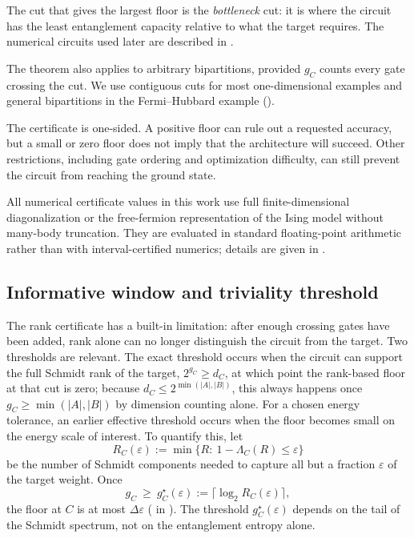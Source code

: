 \documentclass[reprint,aps,pra,floatfix,superscriptaddress,nofootinbib,longbibliography]{revtex4-2}
\theoremstyle{remark}
\theoremstyle{definition}
\begin{document}
The cut that gives the largest floor is the \emph{bottleneck} cut: it is where
the circuit has the least entanglement capacity relative to what the target
requires. The numerical circuits used later are described in
.

The theorem also applies to arbitrary bipartitions, provided $g_C$ counts every
gate crossing the cut. We use contiguous cuts for most one-dimensional examples
and general bipartitions in the Fermi--Hubbard example ().

The certificate is one-sided. A positive floor can rule out a requested
accuracy, but a small or zero floor does not imply that the architecture will
succeed. Other restrictions, including gate
ordering and optimization difficulty, can still prevent the circuit from reaching
the ground state.

All numerical certificate values in this work use full finite-dimensional
diagonalization or the free-fermion representation of the Ising model without
many-body truncation. They
are evaluated in standard floating-point arithmetic rather than with
interval-certified numerics; details are given in .

\subsection{Informative window and triviality threshold}
\label{sec:window}

The rank certificate has a built-in limitation: after enough crossing gates have
been added, rank alone can no longer distinguish the circuit from the target.
Two thresholds are relevant. The exact threshold occurs when the circuit can
support the full Schmidt rank of the target, $2^{g_C}\ge d_C$, at which point
the rank-based floor at that cut is zero; because $d_C\le2^{\min(|A|,|B|)}$,
this always happens once $g_C\ge\min(|A|,|B|)$ by dimension counting alone. For
a chosen energy tolerance, an earlier effective threshold occurs when the floor
becomes small on the energy scale of interest. To quantify this, let
\begin{equation}
  \label{eq:Reps}
  R_C(\varepsilon):=\min\{R:\ 1-\Lambda_C(R)\le\varepsilon\}
\end{equation}
be the number of Schmidt components needed to capture all but a fraction
$\varepsilon$ of the target weight. Once
\begin{equation}
  g_C\ \ge\ g_C^\star(\varepsilon):=\bigl\lceil\log_2 R_C(\varepsilon)\bigr\rceil ,
\end{equation}
the floor at $C$ is at most $\Delta\varepsilon$ ( in
). The threshold $g_C^\star(\varepsilon)$ depends on the tail of the
Schmidt spectrum, not on the entanglement entropy alone.
\end{document}
